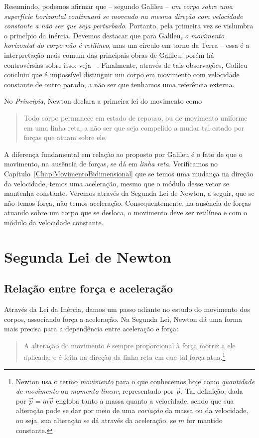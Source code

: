 %
Resumindo, podemos afirmar que -- segundo Galileu -- \emph{um corpo sobre uma superfície horizontal continuará se movendo na mesma direção com velocidade constante a não ser que seja perturbado}. Portanto, pela primeira vez se vislumbra o princípio da inércia. Devemos destacar que para Galileu, \emph{o movimento horizontal do corpo não é retilíneo}, mas um círculo em torno da Terra -- essa é a interpretação mais comum das principais obras de Galileu, porém há controvérsias sobre isso: veja \cite{VASCONCELOS2005} --. Finalmente, através de tais observações, Galileu concluiu que é impossível distinguir um corpo em movimento com velocidade constante de outro parado, a não ser que tenhamos uma referência externa.

No \emph{Principia}, Newton declara a primeira lei do movimento como
\begin{quote}
  Todo corpo permanece em estado de repouso, ou de movimento uniforme em uma linha reta, a não ser que seja compelido a mudar tal estado por forças que atuam sobre ele.
\end{quote}
%
A diferença fundamental em relação ao proposto por Galileu é o fato de que o movimento, na ausência de forças, se dá em \emph{linha reta}. Verificamos no Capítulo~\ref{Chap:MovimentoBidimensional} que se temos uma mudança na direção da velocidade, temos uma aceleração, mesmo que o módulo desse vetor se mantenha constante. Veremos através da Segunda Lei de Newton, a seguir, que se não temos força, não temos aceleração. Consequentemente, na ausência de forças atuando sobre um corpo que se desloca, o movimento deve ser retilíneo e com o módulo da velocidade constante.

\section{Segunda Lei de Newton}
\subsection{Relação entre força e aceleração}

Através da Lei da Inércia, damos um passo adiante no estudo do movimento dos corpos, associando força a aceleração. Na Segunda Lei, Newton dá uma forma mais precisa para a dependência entre aceleração e força:
\begin{quote}
  A alteração do movimento é sempre proporcional à força motriz a ele aplicada; e é feita na direção da linha reta em que tal força atua.\footnote{Newton usa o termo \emph{movimento} para o que conhecemos hoje como \emph{quantidade de movimento} ou \emph{momento linear}, representado por $\vec{p}$. Tal definição, dada por $\vec{p} = m\vec{v}$ engloba tanto a massa quanto a velocidade, sendo que sua alteração pode se dar por meio de uma \emph{variação} da massa ou da velocidade, ou seja, sua alteração se dá através da aceleração, se $m$ for mantido constante.}
\end{quote}
%

